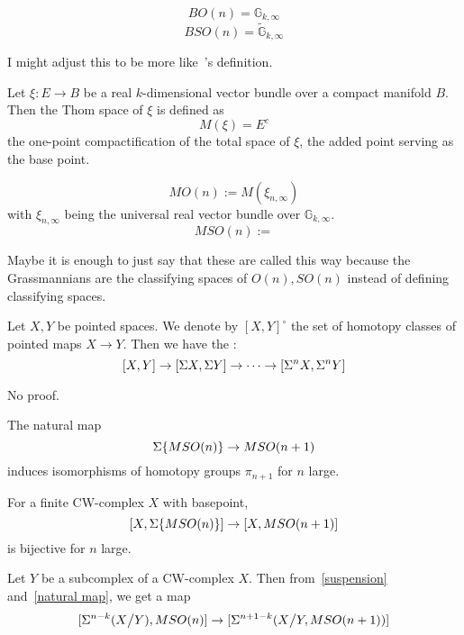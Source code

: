 \documentclass[a4paper,11pt]{article}
\begin{document}
\begin{observation}
    \[BO(n)=\mathbb{G}_{k,\infty}\]
    \[BSO(n)=\widetilde{\mathbb{G}}_{k,\infty}\]
\end{observation}

I might adjust this to be more like\ \cite{thom}'s definition.
\begin{definition}
    Let \(\xi:E\to B\) be a real \(k\)-dimensional vector bundle over a compact manifold \(B\).
    Then the Thom space of \(\xi\) is defined as\[M(\xi)=E^c\] the one-point compactification of the total space of \(\xi\), the added point serving as the base point.
\end{definition}

\begin{definition}
    \[MO(n):=M(\xi_{n,\infty})\] with \(\xi_{n,\infty}\) being the universal real vector bundle over \(\mathbb{G}_{k,\infty}\).
    \[MSO(n):=  \]
\end{definition}
Maybe it is enough to just say that these are called this way because the Grassmannians are the classifying spaces of \(O(n), SO(n)\) instead of defining classifying spaces.

\begin{theorem}\label{suspension}
    Let \(X, Y\) be pointed spaces. We denote by \({[X,Y]}^\circ\) the set of homotopy classes of pointed maps \(X\to Y\). Then we have the :
    \[[X,Y]\to[\Sigma{X},\Sigma{Y}]\to\dots\to[\Sigma^n{X},\Sigma^n{Y}]\] 
\end{theorem}


\begin{theorem}\label{freudenthal}
\end{theorem}

No proof.

\begin{lemma}\label{natural map}\cite{thom}
    The natural map
    \[\Sigma\{MSO(n)\}\to MSO(n+1)\]
    induces isomorphisms of homotopy groups \(\pi_{n+1}\) for \(n\) large.
\end{lemma}

\begin{corollary}
    For a finite CW-complex \(X\) with basepoint, \[[X,\Sigma\{MSO(n)\}]\to[X,MSO(n+1)]\] is bijective for \(n\) large.
\end{corollary}

\begin{lemma}
    Let \(Y\) be a subcomplex of a CW-complex \(X\). Then from\ \ref{suspension} and\ \ref{natural map}, we get a map
    \[[\Sigma^{n-k}(X\big/ Y),MSO(n)]\to[\Sigma^{n+1-k}(X\big/Y, MSO(n+1))]\]
\end{lemma}
\end{document}
